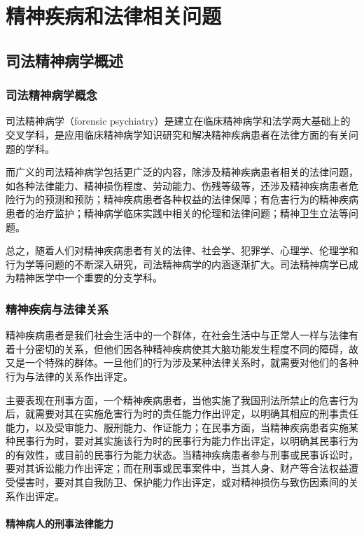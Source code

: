 \chapter{精神疾病和法律相关问题}

\section{司法精神病学概述}

\subsection{司法精神病学概念}

司法精神病学（forensic
psychiatry）是建立在临床精神病学和法学两大基础上的交叉学科，是应用临床精神病学知识研究和解决精神疾病患者在法律方面的有关问题的学科。

而广义的司法精神病学包括更广泛的内容，除涉及精神疾病患者相关的法律问题，如各种法律能力、精神损伤程度、劳动能力、伤残等级等，还涉及精神疾病患者危险行为的预测和预防；精神疾病患者各种权益的法律保障；有危害行为的精神疾病患者的治疗监护；精神病学临床实践中相关的伦理和法律问题；精神卫生立法等问题。

总之，随着人们对精神疾病患者有关的法律、社会学、犯罪学、心理学、伦理学和行为学等问题的不断深入研究，司法精神病学的内涵逐渐扩大。司法精神病学已成为精神医学中一个重要的分支学科。

\subsection{精神疾病与法律关系}

精神疾病患者是我们社会生活中的一个群体，在社会生活中与正常人一样与法律有着十分密切的关系，但他们因各种精神疾病使其大脑功能发生程度不同的障碍，故又是一个特殊的群体。一旦他们的行为涉及某种法律关系时，就需要对他们的各种行为与法律的关系作出评定。

主要表现在刑事方面，一个精神疾病患者，当他实施了我国刑法所禁止的危害行为后，就需要对其在实施危害行为时的责任能力作出评定，以明确其相应的刑事责任能力，以及受审能力、服刑能力、作证能力；在民事方面，当精神疾病患者实施某种民事行为时，要对其实施该行为时的民事行为能力作出评定，以明确其民事行为的有效性，或目前的民事行为能力状态。当精神疾病患者参与刑事或民事诉讼时，要对其诉讼能力作出评定；而在刑事或民事案件中，当其人身、财产等合法权益遭受侵害时，要对其自我防卫、保护能力作出评定，或对精神损伤与致伤因素间的关系作出评定。

\subsubsection{精神病人的刑事法律能力}

